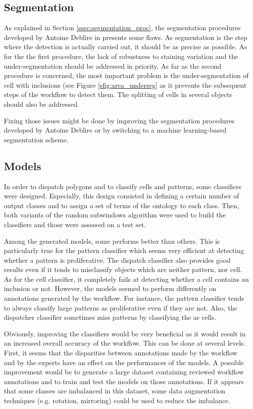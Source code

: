 \subsection{Segmentation}
As explained in Section \ref{ssec:segmentation_proc}, the segmentation procedures developed by Antoine Deblire in \cite{adeblire2013} presents some flaws. As segmentation is the step where the detection is actually carried out, it should be as precise as possible. As for the the first procedure, the lack of robustness to staining variation and the under-segmentation should be addressed in priority. As far as the second procedure is concerned, the most important problem is the under-segmentation of cell with inclusions (see Figure \ref{sfig:area_underseg} as it prevents the subsequent steps of the workflow to detect them. The splitting of cells in several objects should also be addressed. 

Fixing those issues might be done by improving the segmentation procedures developed by Antoine Deblire or by switching to a machine learning-based segmentation scheme.

\subsection{Models}
In order to dispatch polygons and to classify cells and patterns, some classifiers were designed. Especially, this design consisted in defining a certain number of output classes and to assign a set of terms of the ontology to each class. Then, both variants of the random subwindows algorithm were used to build the classifiers and those were assessed on a test set. 

Among the generated models, some performs better than others. This is particularly true for the pattern classifier which seems very efficient at detecting whether a pattern is proliferative. The dispatch classifier also provides good results even if it tends to misclassify objects which are neither pattern, nor cell. As for the cell classifier, it completely fails at detecting whether a cell contains an inclusion or not. However, the models seemed to perform differently on annotations generated by the workflow. For instance, the pattern classifier tends to always classify large patterns as proliferative even if they are not. Also, the dispatcher classifier sometimes miss patterns by classifying the as cells. 

Obviously, improving the classifiers would be very beneficial as it would result in an increased overall accuracy of the workflow. This can be done at several levels. First, it seems that the disparities between annotations made by the workflow and by the experts have an effect on the performances of the models. A possible improvement would be to generate a large dataset containing reviewed workflow annotations and to train and test the models on those annotations.  If it appears that some classes are imbalanced in this dataset, some data augmentation techniques (e.g. rotation, mirroring) could be used to reduce the imbalance.  

